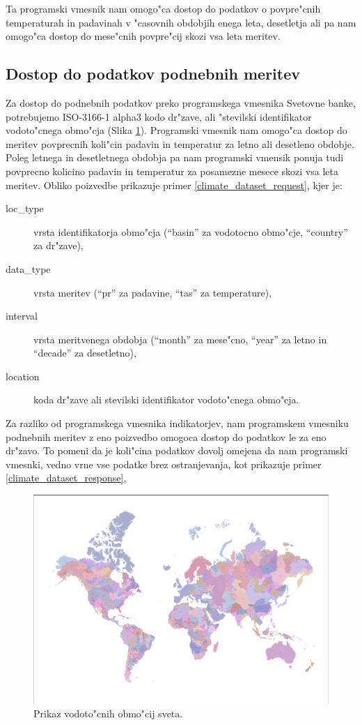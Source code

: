 Ta programski vmesnik nam omogo"ca dostop do podatkov o povpre"cnih 
temperaturah in padavinah v "casovnih obdobjih enega leta, desetletja ali pa 
nam omogo"ca dostop do mese"cnih povpre"cij skozi vsa leta meritev.


\subsection{Dostop do podatkov podnebnih meritev}

Za dostop do podnebnih podatkov preko programskega vmesnika Svetovne banke,
potrebujemo ISO-3166-1 alpha3 kodo dr"zave, ali "stevilski identifikator
vodoto"cnega obmo"cja (Slika \ref{climate_data_api_basins}). Programski vmesnik
nam omogo"ca dostop do meritev povprecnih koli"cin padavin in temperatur za 
letno ali desetleno obdobje. Poleg letnega in desetletnega obdobja pa nam 
programski vmensik ponuja tudi povprecno kolicino padavin in temperatur za 
posamezne mesece skozi vsa leta meritev. Obliko poizvedbe prikazuje primer 
\ref{climate_dataset_request}, kjer je:
\begin{description}
\item [loc\_type] vrsta identifikatorja obmo"cja (``basin'' za vodotocno obmo"cje, 
  ``country'' za dr"zave),
\item [data\_type] vrsta meritev (``pr'' za padavine, ``tas'' za temperature),
\item [interval] vrsta meritvenega obdobja (``month'' za mese"cno, ``year'' za letno in
  ``decade'' za desetletno),
\item [location] koda dr"zave ali stevilski identifikator vodoto"cnega obmo"cja.
\end{description}
Za razliko od programskega vmesnika indikatorjev, nam programskem vmesniku
podnebnih meritev z eno poizvedbo omogoca dostop do podatkov le za eno dr"zavo.
To pomeni da je koli"cina podatkov dovolj omejena da nam programski vmesnki,
vedno vrne vse podatke brez ostranjevanja, kot prikazuje primer 
\ref{climate_dataset_response},


\begin{figure}
\begin{center}
\includegraphics[width=12cm]{pic/climate_data_api_basins.pdf}
\end{center}
\caption{Prikaz vodoto"cnih obmo"cij sveta.}
\label{climate_data_api_basins}
\end{figure} 


